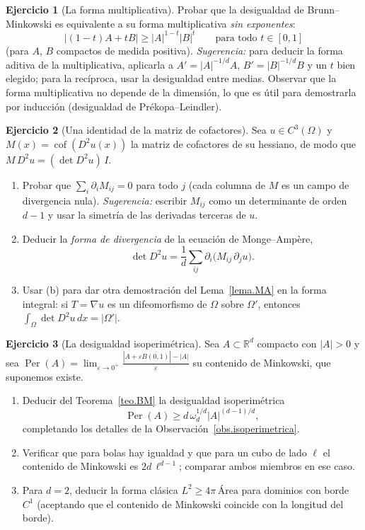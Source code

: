 \documentclass[12pt, a4paper]{amsbook}
\newcommand{\ve}{\varepsilon}
\newcommand{\R}{{\mathbb R}}
\theoremstyle{remark}
\theoremstyle{definition}
\newtheorem{ejercicio}{Ejercicio}[chapter]
\numberwithin{section}{chapter}
\numberwithin{subsection}{section}
\numberwithin{equation}{section}
\numberwithin{figure}{chapter}
\begin{document}
\begin{ejercicio}[La forma multiplicativa]\label{ejer.BM.multiplicativa}
Probar que la desigualdad de Brunn--Minkowski es equivalente a su forma
multiplicativa \emph{sin exponentes}:
\[
|(1-t)A+tB|\ge|A|^{1-t}|B|^{t}\qquad\text{para todo }t\in[0,1]
\]
(para $A$, $B$ compactos de medida positiva). \emph{Sugerencia:} para
deducir la forma aditiva de la multiplicativa, aplicarla a
$A'=|A|^{-1/d}A$, $B'=|B|^{-1/d}B$ y un $t$ bien elegido; para la
recíproca, usar la desigualdad entre medias. Observar que la forma
multiplicativa no depende de la dimensión, lo que es útil para demostrarla
por inducción (desigualdad de Prékopa--Leindler).
\end{ejercicio}

\begin{ejercicio}[Una identidad de la matriz de cofactores]\label{ejer.BM.cofactores}
Sea $u\in C^3(\Omega)$ y $M(x)=\operatorname{cof}(D^2u(x))$ la matriz de
cofactores de su hessiano, de modo que $M\,D^2u=(\det D^2u)\,I$.
\begin{enumerate}[label=(\alph*)]
\item Probar que $\sum_i\partial_iM_{ij}=0$ para todo $j$ (cada columna de
$M$ es un campo de divergencia nula). \emph{Sugerencia:} escribir
$M_{ij}$ como un determinante de orden $d-1$ y usar la simetría de las
derivadas terceras de $u$.
\item Deducir la \emph{forma de divergencia} de la ecuación de
Monge--Ampère,
\[
\det D^2u=\frac1d\sum_{ij}\partial_i\bigl(M_{ij}\,\partial_ju\bigr).
\]
\item Usar (b) para dar otra demostración del Lema~\ref{lema.MA} en la
forma integral: si $T=\nabla u$ es un difeomorfismo de $\Omega$ sobre
$\Omega'$, entonces $\int_\Omega\det D^2u\,dx=|\Omega'|$.
\end{enumerate}
\end{ejercicio}

\begin{ejercicio}[La desigualdad isoperimétrica]\label{ejer.BM.isoperimetrica}
Sea $A\subset\R^d$ compacto con $|A|>0$ y sea
$\operatorname{Per}(A)=\lim_{\ve\to0^+}\frac{|A+\ve\overline{B(0,1)}|-|A|}{\ve}$
su contenido de Minkowski, que suponemos existe.
\begin{enumerate}[label=(\alph*)]
\item Deducir del Teorema~\ref{teo.BM} la desigualdad isoperimétrica
\[
\operatorname{Per}(A)\ge d\,\omega_d^{1/d}|A|^{(d-1)/d},
\]
completando los detalles de la Observación~\ref{obs.isoperimetrica}.
\item Verificar que para bolas hay igualdad y que para un cubo de lado
$\ell$ el contenido de Minkowski es $2d\,\ell^{d-1}$; comparar ambos
miembros en ese caso.
\item Para $d=2$, deducir la forma clásica $L^2\ge4\pi\,\text{Área}$ para
dominios con borde $C^1$ (aceptando que el contenido de Minkowski coincide
con la longitud del borde).
\end{enumerate}
\end{ejercicio}
\end{document}
